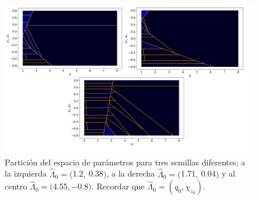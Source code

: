 \begin{figure}[h!]
\centering
\includegraphics[width=1.05\columnwidth ,trim={1.1cm, 1cm, 1cm, 1.2cm}]{figs/3_semillas_particion.png}
\caption{Partición del espacio de parámetros para tres semillas diferentes; a la izquierda $\hat{\Lambda}_0 = ($1.2$,\  $0.38$)$, a la derecha $\hat{\Lambda}_0 = ($1.71$,\  $0.04$)$ y al centro $\hat{\Lambda}_0 =($4.55$,  -$0.8$)$. Recordar que $\hat{\Lambda}_0 = (q_0, \chi_{z_0})$.}
\label{fig:seeds_part}
\end{figure}
